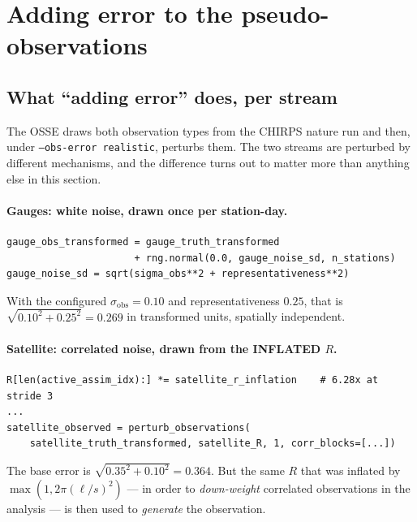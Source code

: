 %

\section{Adding error to the pseudo-observations}
\label{sec:osse-error}

\subsection{What ``adding error'' does, per stream}

The OSSE draws both observation types from the CHIRPS nature run and then, under
\texttt{--obs-error realistic}, perturbs them. The two streams are perturbed by
different mechanisms, and the difference turns out to matter more than anything
else in this section.

\paragraph{Gauges: white noise, drawn once per station-day.}
\begin{verbatim}
gauge_obs_transformed = gauge_truth_transformed
                      + rng.normal(0.0, gauge_noise_sd, n_stations)
gauge_noise_sd = sqrt(sigma_obs**2 + representativeness**2)
\end{verbatim}
With the configured $\sigma_{\mathrm{obs}} = 0.10$ and representativeness
$0.25$, that is $\sqrt{0.10^2 + 0.25^2} = 0.269$ in transformed units, spatially
independent.

\paragraph{Satellite: correlated noise, drawn from the INFLATED $R$.}
\begin{verbatim}
R[len(active_assim_idx):] *= satellite_r_inflation    # 6.28x at stride 3
...
satellite_observed = perturb_observations(
    satellite_truth_transformed, satellite_R, 1, corr_blocks=[...])
\end{verbatim}
The base error is $\sqrt{0.35^2 + 0.10^2} = 0.364$. But the same $R$ that was
inflated by $\max(1, 2\pi(\ell/s)^2)$ --- in order to \emph{down-weight}
correlated observations in the analysis --- is then used to \emph{generate} the
observation.

